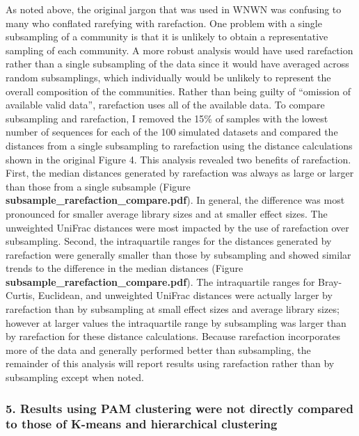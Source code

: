 \documentclass[
]{article}
\begin{document}
As noted above, the original jargon that was used in WNWN was confusing
to many who conflated rarefying with rarefaction. One problem with a
single subsampling of a community is that it is unlikely to obtain a
representative sampling of each community. A more robust analysis would
have used rarefaction rather than a single subsampling of the data since
it would have averaged across random subsamplings, which individually
would be unlikely to represent the overall composition of the
communities. Rather than being guilty of ``omission of available valid
data'', rarefaction uses all of the available data. To compare
subsampling and rarefaction, I removed the 15\% of samples with the
lowest number of sequences for each of the 100 simulated datasets and
compared the distances from a single subsampling to rarefaction using
the distance calculations shown in the original Figure 4. This analysis
revealed two benefits of rarefaction. First, the median distances
generated by rarefaction was always as large or larger than those from a
single subsample (Figure \textbf{subsample\_rarefaction\_compare.pdf}).
In general, the difference was most pronounced for smaller average
library sizes and at smaller effect sizes. The unweighted UniFrac
distances were most impacted by the use of rarefaction over subsampling.
Second, the intraquartile ranges for the distances generated by
rarefaction were generally smaller than those by subsampling and showed
similar trends to the difference in the median distances (Figure
\textbf{subsample\_rarefaction\_compare.pdf}). The intraquartile ranges
for Bray-Curtis, Euclidean, and unweighted UniFrac distances were
actually larger by rarefaction than by subsampling at small effect sizes
and average library sizes; however at larger values the intraquartile
range by subsampling was larger than by rarefaction for these distance
calculations. Because rarefaction incorporates more of the data and
generally performed better than subsampling, the remainder of this
analysis will report results using rarefaction rather than by
subsampling except when noted.

\hypertarget{results-using-pam-clustering-were-not-directly-compared-to-those-of-k-means-and-hierarchical-clustering}{%
\subsubsection{5. Results using PAM clustering were not directly
compared to those of K-means and hierarchical
clustering}\label{results-using-pam-clustering-were-not-directly-compared-to-those-of-k-means-and-hierarchical-clustering}}
\end{document}
